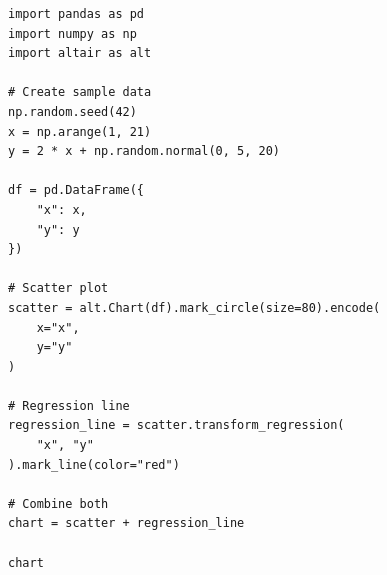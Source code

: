 \begin{verbatim}
import pandas as pd
import numpy as np
import altair as alt

# Create sample data
np.random.seed(42)
x = np.arange(1, 21)
y = 2 * x + np.random.normal(0, 5, 20)

df = pd.DataFrame({
    "x": x,
    "y": y
})

# Scatter plot
scatter = alt.Chart(df).mark_circle(size=80).encode(
    x="x",
    y="y"
)

# Regression line
regression_line = scatter.transform_regression(
    "x", "y"
).mark_line(color="red")

# Combine both
chart = scatter + regression_line

chart
\end{verbatim}